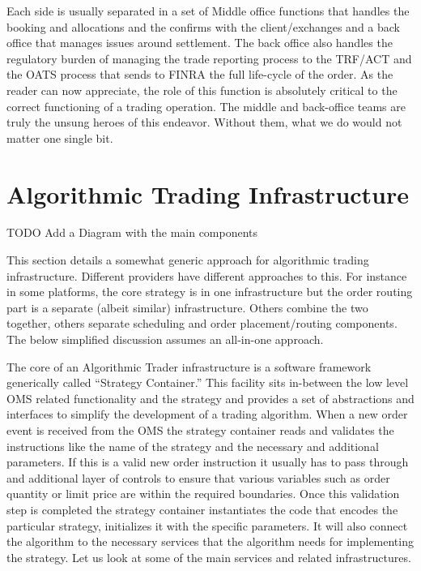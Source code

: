 Each side is usually separated in a set of Middle office functions that handles the booking and allocations and the confirms with the client/exchanges and a back office that manages issues around settlement.
The back office also handles the regulatory burden of  managing the trade reporting process to the TRF/ACT and the OATS process that sends to FINRA the full life-cycle of the order. As the reader can now appreciate, the role of this function is absolutely critical to the correct functioning of a trading operation. The middle and back-office teams are truly the unsung heroes of this endeavor. Without them, what we do would not matter one single bit.



\section{Algorithmic Trading Infrastructure}

TODO Add a Diagram with the main components


This section details a somewhat generic approach for algorithmic trading infrastructure. Different providers have different approaches to this. For instance in some platforms, the core strategy is in one infrastructure but the order routing part is a separate (albeit similar) infrastructure. Others combine the two together, others separate scheduling and order placement/routing components. The below simplified discussion assumes an all-in-one approach.


The core of an Algorithmic Trader infrastructure is a software framework generically called ``Strategy Container.'' This facility sits in-between the low level OMS related functionality and the strategy and provides a set of abstractions and interfaces to simplify the development of a trading algorithm. When a new order event is received from the OMS the strategy container reads and validates the instructions like the name of the strategy and the necessary and additional parameters. If this is a valid new order instruction it usually has to pass through and additional layer of controls to ensure that various variables such as order quantity or limit price are within the required boundaries. Once this validation step is completed the strategy container instantiates the code that encodes the particular strategy, initializes it with the specific parameters. It will also connect the algorithm to the necessary services that the algorithm needs for implementing the strategy. Let us look at some of the main services and related infrastructures. \\


